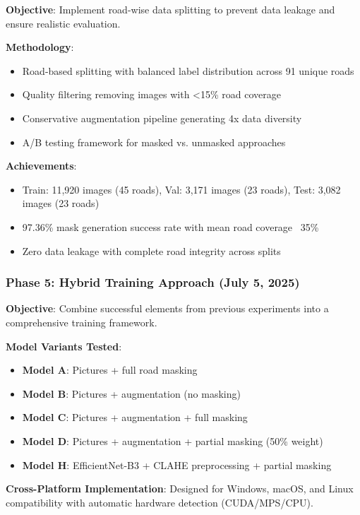 \documentclass[12pt]{article}
\begin{document}
\textbf{Objective}: Implement road-wise data splitting to prevent data leakage and ensure realistic evaluation.

\textbf{Methodology}:
\begin{itemize}[itemsep=1pt,parsep=0pt,topsep=2pt]
\item Road-based splitting with balanced label distribution across 91 unique roads
\item Quality filtering removing images with <15\% road coverage
\item Conservative augmentation pipeline generating 4x data diversity
\item A/B testing framework for masked vs. unmasked approaches
\end{itemize}

\textbf{Achievements}:
\begin{itemize}[itemsep=1pt,parsep=0pt,topsep=2pt]
\item Train: 11,920 images (45 roads), Val: 3,171 images (23 roads), Test: 3,082 images (23 roads)
\item 97.36\% mask generation success rate with mean road coverage ~35\%
\item Zero data leakage with complete road integrity across splits
\end{itemize}

\subsubsection{Phase 5: Hybrid Training Approach (July 5, 2025)}

\textbf{Objective}: Combine successful elements from previous experiments into a comprehensive training framework.

\textbf{Model Variants Tested}:
\begin{itemize}[itemsep=1pt,parsep=0pt,topsep=2pt]
\item \textbf{Model A}: Pictures + full road masking
\item \textbf{Model B}: Pictures + augmentation (no masking)
\item \textbf{Model C}: Pictures + augmentation + full masking
\item \textbf{Model D}: Pictures + augmentation + partial masking (50\% weight)
\item \textbf{Model H}: EfficientNet-B3 + CLAHE preprocessing + partial masking
\end{itemize}

\textbf{Cross-Platform Implementation}: Designed for Windows, macOS, and Linux compatibility with automatic hardware detection (CUDA/MPS/CPU).
\end{document}
